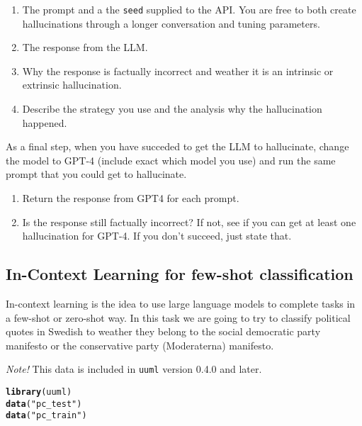 \documentclass[11pt,a4paper,english]{article}\usepackage[]{graphicx}\usepackage[]{xcolor}
\makeatletter
\newcommand{\hlstr}[1]{\textcolor[rgb]{0.192,0.494,0.8}{#1}}%
\newcommand{\hlstd}[1]{\textcolor[rgb]{0.345,0.345,0.345}{#1}}%
\newcommand{\hlkwd}[1]{\textcolor[rgb]{0.737,0.353,0.396}{\textbf{#1}}}%
\newenvironment{kframe}{%
 \def\at@end@of@kframe{}%
 \ifinner\ifhmode%
  \def\at@end@of@kframe{\end{minipage}}%
  \begin{minipage}{\columnwidth}%
 \fi\fi%
 \def\FrameCommand##1{\hskip\@totalleftmargin \hskip-\fboxsep
 \colorbox{shadecolor}{##1}\hskip-\fboxsep
     \hskip-\linewidth \hskip-\@totalleftmargin \hskip\columnwidth}%
 \MakeFramed {\advance\hsize-\width
   \@totalleftmargin\z@ \linewidth\hsize
   \@setminipage}}%
 {\par\unskip\endMakeFramed%
 \at@end@of@kframe}
\newenvironment{knitrout}{}{} %
\makeatother
\begin{document}
\begin{enumerate}
\item The prompt and a the \texttt{seed} supplied to the API. You are free to both create hallucinations through a longer conversation and tuning parameters.
\item The response from the LLM.
\item Why the response is factually incorrect and weather it is an intrinsic or extrinsic hallucination.
\item Describe the strategy you use and the analysis why the hallucination happened.
\end{enumerate}

As a final step, when you have succeded to get the LLM to hallucinate, change the model to GPT-4 (include exact which model you use) and run the same prompt that you could get to hallucinate.

\begin{enumerate}
\item Return the response from GPT4 for each prompt.
\item Is the response still factually incorrect? If not, see if you can get at least one hallucination for GPT-4. If you don't succeed, just state that.
\end{enumerate}



\subsection{In-Context Learning for few-shot classification}

In-context learning is the idea to use large language models to complete tasks in a few-shot or zero-shot way. In this task we are going to try to classify political quotes in Swedish to weather they belong to the social democratic party manifesto or the conservative party (Moderaterna) manifesto.

\emph{Note!} This data is included in \texttt{uuml} version 0.4.0 and later.

\begin{knitrout}\small
{}\color{fgcolor}\begin{kframe}
\begin{alltt}
\hlkwd{library}\hlstd{(uuml)}
\hlkwd{data}\hlstd{(}\hlstr{"pc_test"}\hlstd{)}
\hlkwd{data}\hlstd{(}\hlstr{"pc_train"}\hlstd{)}
\end{alltt}
\end{kframe}
\end{knitrout}
\end{document}
